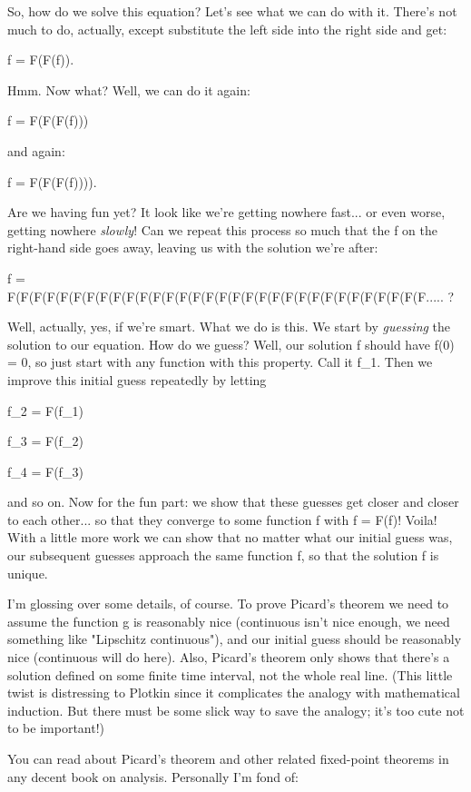 So, how do we solve this equation?  Let's see what we can do with it.
There's not much to do, actually, except substitute the left side into 
the right side and get:

f = F(F(f)).

Hmm.  Now what?  Well, we can do it again:

f = F(F(F(f)))

and again:

f = F(F(F(f)))).

Are we having fun yet?   It look like we're getting nowhere fast...
or even worse, getting nowhere \emph{slowly}!  Can we repeat this process so 
much that the f on the right-hand side goes away, leaving us with the
solution we're after:

f = F(F(F(F(F(F(F(F(F(F(F(F(F(F(F(F(F(F(F(F(F(F(F(F(F(F(F(F(F(F(F(F..... ?

Well, actually, yes, if we're smart.  What we do is this.  We start by
\emph{guessing} the solution to our equation.  How do we guess?  Well, our
solution f should have f(0) = 0, so just start with any function with
this property.  Call it f_{1}.  Then we improve this initial guess
repeatedly by letting

f_{2} = F(f_{1})

f_{3} = F(f_{2})

f_{4} = F(f_{3})

and so on.  Now for the fun part: we show that these guesses get closer
and closer to each other... so that they converge to some function f 
with f = F(f)!  Voila!   With a little more work we can show that no
matter what our initial guess was, our subsequent guesses approach the
same function f, so that the solution f is unique.

I'm glossing over some details, of course.  To prove Picard's theorem we
need to assume the function g is reasonably nice (continuous isn't nice
enough, we need something like "Lipschitz continuous"), and our initial
guess should be reasonably nice (continuous will do here).  Also,
Picard's theorem only shows that there's a solution defined on some
finite time interval, not the whole real line.  (This little twist is
distressing to Plotkin since it complicates the analogy with
mathematical induction.  But there must be some slick way to save the
analogy; it's too cute not to be important!)

You can read about Picard's theorem and other related fixed-point
theorems in any decent book on analysis.  Personally I'm fond of:


